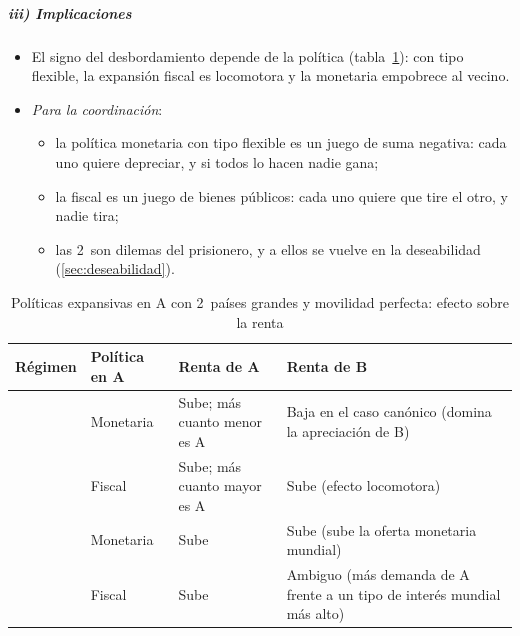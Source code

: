\documentclass[11pt]{article}
\begin{document}
\subparagraph{iii) Implicaciones}
\begin{itemize}
\item El signo del desbordamiento depende de la política (tabla~\ref{tab:mundell-fleming-2-completa}): con tipo flexible, la expansión fiscal es locomotora y la monetaria empobrece al vecino.
\item \emph{Para la coordinación}:
  \begin{itemize}
  \item la política monetaria con tipo flexible es un juego de suma negativa: cada uno quiere depreciar, y si todos lo hacen nadie gana;
  \item la fiscal es un juego de bienes públicos: cada uno quiere que tire el otro, y nadie tira;
  \item las 2~son dilemas del prisionero, y a ellos se vuelve en la deseabilidad (\ref{sec:deseabilidad}).
  \end{itemize}
\end{itemize}

\begin{table}[H]
\centering
\caption{Políticas expansivas en A con 2~países grandes y movilidad perfecta: efecto sobre la renta}\label{tab:mundell-fleming-2-completa}
\small
\begin{tabular}{>{\raggedright\arraybackslash}m{2.4cm}|>{\raggedright\arraybackslash}m{2.6cm}|>{\raggedright\arraybackslash}m{4.4cm}|>{\raggedright\arraybackslash}m{4.4cm}}
\rowcolor{tceeazulpalido}\textbf{Régimen} & \textbf{Política en A} & \textbf{Renta de A} & \textbf{Renta de B}\\
\hline
\multirow{2}{=}{Tipo flexible} & Monetaria & \textcolor{tceeverde}{Sube}; más cuanto menor es A & \textcolor{tceerojo}{Baja} en el caso canónico (domina la apreciación de B)\\
\hhline{~|-|-|-}
 & Fiscal & \textcolor{tceeverde}{Sube}; más cuanto mayor es A & \textcolor{tceeverde}{Sube} (efecto locomotora)\\
\hline
\multirow{2}{=}{Tipo fijo} & Monetaria & \textcolor{tceeverde}{Sube} & \textcolor{tceeverde}{Sube} (sube la oferta monetaria mundial)\\
\hhline{~|-|-|-}
 & Fiscal & \textcolor{tceeverde}{Sube} & \textcolor{tceedorado}{Ambiguo} (más demanda de A frente a un tipo de interés mundial más alto)\\
\hline
\end{tabular}
\end{table}
\end{document}
